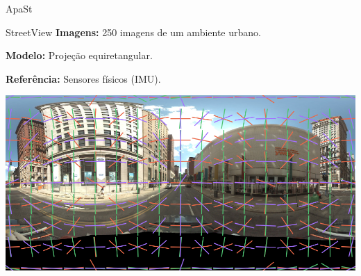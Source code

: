 \begin{frame}{ApaSt}
\end{frame}






\begin{frame}{StreetView}{}
  {\bf Imagens:} 250 imagens de um ambiente urbano.

  {\bf Modelo:} Projeção equiretangular.

  {\bf Referência:} Sensores físicos (IMU).
  \centerline{\includegraphics[height=10\baselineskip]{equi.png}}
\end{frame}


